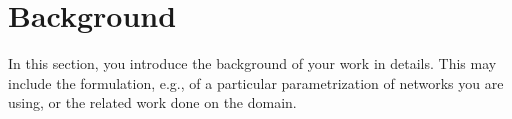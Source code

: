 \section{Background}
\label{sec:thesis_related}

In this section, you introduce the background of your work in details. This may include the formulation, e.g., of a particular parametrization of networks you are using, or the related work done on the domain. 
